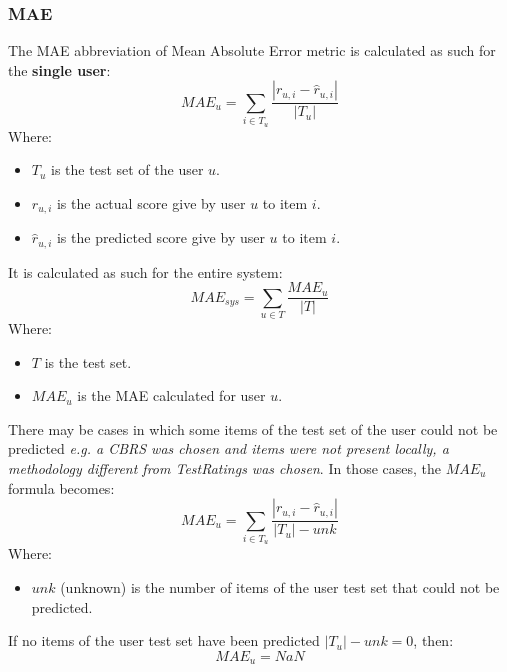 \documentclass[11pt]{article}
\begin{document}
\subsubsection{MAE}\label{subsubsec:mae}
The MAE abbreviation of Mean Absolute Error metric is calculated as such for the \textbf{single user}:
\hfill\break
\hfill\break
    \[
        MAE_u = \sum_{i \in T_u} \frac{|r_{u,i} - \hat{r}_{u,i}|}{|T_u|}
    \]
\hfill\break
\hfill\break
    Where:
\begin{itemize}
    \item $T_u$ is the test set of the user $u$.
    \item $r_{u, i}$ is the actual score give by user $u$ to item $i$.
    \item $\hat{r}_{u, i}$ is the predicted score give by user $u$ to item $i$.
\end{itemize}
\hfill\break
\hfill\break
It is calculated as such for the entire system:
\hfill\break
\hfill\break
    \[
        MAE_{sys} = \sum_{u \in T} \frac{MAE_u}{|T|}
    \]
\hfill\break
\hfill\break
    Where:
\begin{itemize}
    \item $T$ is the test set.
    \item $MAE_u$ is the MAE calculated for user $u$.
\end{itemize}
\hfill\break
\hfill\break
There may be cases in which some items of the test set of the user could not be predicted
\textit{e.g. a CBRS was chosen and items were not present locally, a methodology different from TestRatings was chosen}.
In those cases, the $MAE_u$ formula becomes:
\hfill\break
\hfill\break
    \[
        MAE_u = \sum_{i \in T_u} \frac{|r_{u,i} - \hat{r}_{u,i}|}{|T_u| - unk}
    \]
\hfill\break
\hfill\break
    Where:
\begin{itemize}
    \item $unk$ (unknown) is the number of items of the user test set that could not be predicted.
\end{itemize}
\hfill\break
\hfill\break
If no items of the user test set have been predicted $|T_u| - unk = 0$, then:
\hfill\break
\hfill\break
    \[
        MAE_u = NaN
    \]
\hfill\break
\hfill\break

\end{document}
